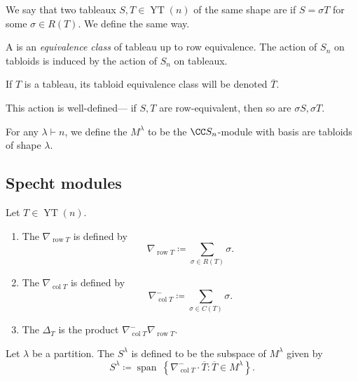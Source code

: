 \documentclass{article}
\DeclareMathOperator{\row}{row}
\DeclareMathOperator{\col}{col}
\DeclareMathOperator{\YT}{YT}
\begin{document}
\begin{definition}
    We say that two tableaux $S,T \in \YT(n)$ of the same shape are  if $S = \sigma T$ for some $\sigma \in R(T)$.
    We define  the same way.
\end{definition}


\begin{definition}
    A  is an \textit{equivalence class} of tableau up to row equivalence.
    The action of $S_n$ on tabloids is induced by the action of $S_n$ on tableaux.

    If $T$ is a tableau, its tabloid equivalence class will be denoted $\overline{T}$.
\end{definition}

This action is well-defined--- if $S,T$ are row-equivalent, then so are $\sigma S, \sigma T$.

\begin{definition}
    For any $\lambda \vdash n$, we define the  $M^\lambda$ to be the $\CC S_n$-module with basis are tabloids of shape $\lambda$.
\end{definition}

\subsection{Specht modules}

\begin{definition}
    Let $T \in \YT(n)$.
    \begin{enumerate}[label=(\alph*)]
        \item 
            The  $\nabla_{\row T}$ is defined by
            \[
                \nabla_{\row T}
                \coloneq
                \sum_{\sigma \in R(T)}
                \sigma.
            \]
        \item 
            The  $\nabla_{\col T}$ is defined by
            \[
                \nabla_{\col T}^-
                \coloneq
                \sum_{\sigma \in C(T)}
                \sigma.
            \]
        \item 
            The  $\Delta_T$ is the product $\nabla_{\col T}^- \nabla_{\row T}$.
    \end{enumerate}
\end{definition}

\begin{definition}
    Let $\lambda$ be a partition.
    The  $S^\lambda$ is defined to be the subspace of $M^\lambda$ given by
    \[
        S^\lambda
        \coloneq
        \operatorname{span}\
        \left\{
            \nabla_{\col T}^- \cdot \overline{T} :
            \overline{T} \in M^\lambda
        \right\}.
    \]
\end{definition}
\end{document}
